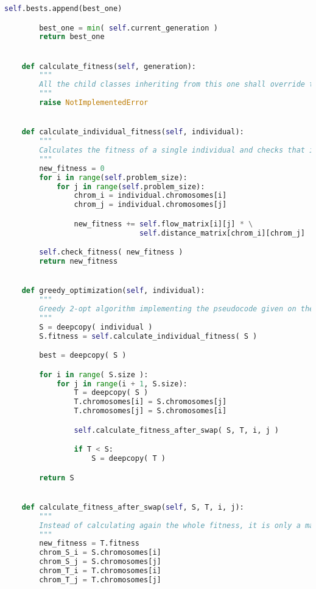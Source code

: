 \begin{lstlisting}[language=python]
            self.bests.append(best_one)

        best_one = min( self.current_generation )
        return best_one


    def calculate_fitness(self, generation):
        """
        All the child classes inheriting from this one shall override this function.
        """
        raise NotImplementedError


    def calculate_individual_fitness(self, individual):
        """
        Calculates the fitness of a single individual and checks that it is not greater than the possible maximum.
        """
        new_fitness = 0
        for i in range(self.problem_size):
            for j in range(self.problem_size):
                chrom_i = individual.chromosomes[i]
                chrom_j = individual.chromosomes[j]

                new_fitness += self.flow_matrix[i][j] * \
                               self.distance_matrix[chrom_i][chrom_j]

        self.check_fitness( new_fitness )
        return new_fitness


    def greedy_optimization(self, individual):
        """
        Greedy 2-opt algorithm implementing the pseudocode given on the problem statement. The do/while loop has been ommited from the algorithm as it is virtually impossible that after all the permutations S == best, and even though if that was the case it would not change for executing for loops again.
        """
        S = deepcopy( individual )
        S.fitness = self.calculate_individual_fitness( S )

        best = deepcopy( S )

        for i in range( S.size ):
            for j in range(i + 1, S.size):
                T = deepcopy( S )
                T.chromosomes[i] = S.chromosomes[j]
                T.chromosomes[j] = S.chromosomes[i]

                self.calculate_fitness_after_swap( S, T, i, j )

                if T < S:
                    S = deepcopy( T )

        return S


    def calculate_fitness_after_swap(self, S, T, i, j):
        """
        Instead of calculating again the whole fitness, it is only a matter of calculing the chromosomes that have been changed, reducing complexity from n^2 to 2n
        """
        new_fitness = T.fitness
        chrom_S_i = S.chromosomes[i]
        chrom_S_j = S.chromosomes[j]
        chrom_T_i = T.chromosomes[i]
        chrom_T_j = T.chromosomes[j]


\end{lstlisting}
